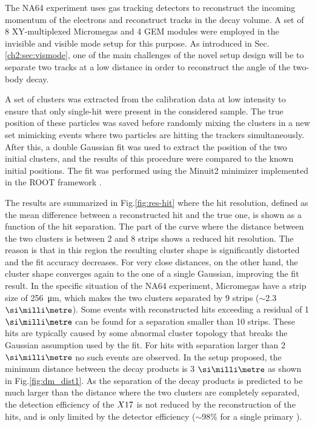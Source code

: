 The NA64 experiment uses gas tracking detectors to reconstruct the incoming momentum of the electrons and reconstruct tracks in the decay volume. A set of 8 XY-multiplexed Micromegas and 4 GEM modules were employed in the invisible and visible mode setup for this purpose. As introduced in Sec.\ref{ch2:sec:vismode}, one of the main challenges of the novel setup design will be to separate two tracks at a low distance in order to reconstruct the angle of the two-body decay.

A set of clusters was extracted from the calibration data at low intensity to ensure that only single-hit were present in the considered sample. The true position of these particles was saved before randomly mixing the clusters in a new set mimicking events where two particles are hitting the trackers simultaneously. After this, a double Gaussian fit was used to extract the position of the two initial clusters, and the results of this procedure were compared to the known initial positions. The fit was performed using the Minuit2 minimizer implemented in the ROOT framework \cite{root}.

The results are summarized in Fig.\ref{fig:res-hit} where the hit resolution, defined as the mean difference between a reconstructed hit and the true one, is shown as a function of the hit separation. The part of the curve where the distance between the two clusters is between 2 and 8 strips shows a reduced hit resolution. The reason is that in this region the resulting cluster shape is significantly distorted and the fit accuracy decreases. For very close distances, on the other hand, the cluster shape converges again to the one of a single Gaussian, improving the fit result. In the specific situation of the NA64 experiment, Micromegas have a strip size of \SI{256}{\micro\meter}, which makes the two clusters separated by 9 strips ($\sim$2.3 $\mmi$). Some events with reconstructed hits exceeding a residual of 1 $\mmi$ can be found for a separation smaller than 10 strips. These hits are typically caused by some abnormal cluster topology that breaks the Gaussian assumption used by the fit. For hits with separation larger than 2 $\mmi$ no such events are observed. In the setup proposed, the minimum distance between the decay products is 3 $\mmi$ as shown in Fig.\ref{fig:dm_dist1}. As the separation of the decay products is predicted to be much larger than the distance where the two clusters are completely separated, the detection efficiency of the $X17$ is not reduced by the reconstruction of the hits, and is only limited by the detector efficiency ($\sim$98\% for a single primary \cite{Banerjee:2017mdu}).

